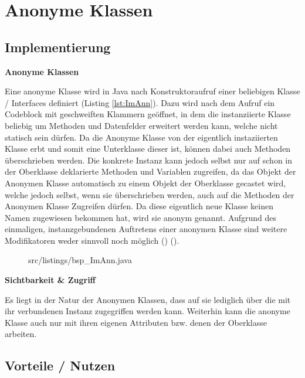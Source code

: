 \section{Anonyme Klassen}
\subsection {Implementierung}

{\Large \bf Anonyme Klassen}

Eine anonyme Klasse wird in Java nach Konstruktoraufruf einer beliebigen Klasse / Interfaces definiert (Listing \ref{lst:ImAnn}).
Dazu wird nach dem Aufruf ein Codeblock mit geschweiften Klammern geöffnet, in dem die instanziierte Klasse beliebig um Methoden und Datenfelder erweitert werden kann, welche nicht statisch sein dürfen.
Da die Anonyme Klasse von der eigentlich instaziierten Klasse erbt und somit eine Unterklasse dieser ist, können dabei auch Methoden überschrieben werden.
Die konkrete Instanz kann jedoch selbst nur auf schon in der Oberklasse deklarierte Methoden und Variablen zugreifen, da das Objekt der Anonymen Klasse automatisch zu einem Objekt der Oberklasse gecastet wird, welche jedoch selbst, wenn sie überschrieben werden, auch auf die Methoden der Anonymen Klasse Zugreifen dürfen.
Da diese eigentlich neue Klasse keinen Namen zugewiesen bekommen hat, wird sie anonym genannt.
Aufgrund des einmaligen, instanzgebundenen Auftretens einer anonymen Klasse sind weitere Modifikatoren weder sinnvoll noch möglich (\cite{goll2013java}) (\cite{Oracle:JLS9}).

\begin{figure}[H]
\lstset{language=Java}
 {src/listings/bsp_ImAnn.java}
\end{figure}

{\bf Sichtbarkeit \& Zugriff}

Es liegt in der Natur der Anonymen Klassen, dass auf sie lediglich über die mit ihr verbundenen Instanz zugegriffen werden kann.
Weiterhin kann die anonyme Klasse auch nur mit ihren eigenen Attributen bzw. denen der Oberklasse arbeiten.

\subsection{Vorteile / Nutzen}

